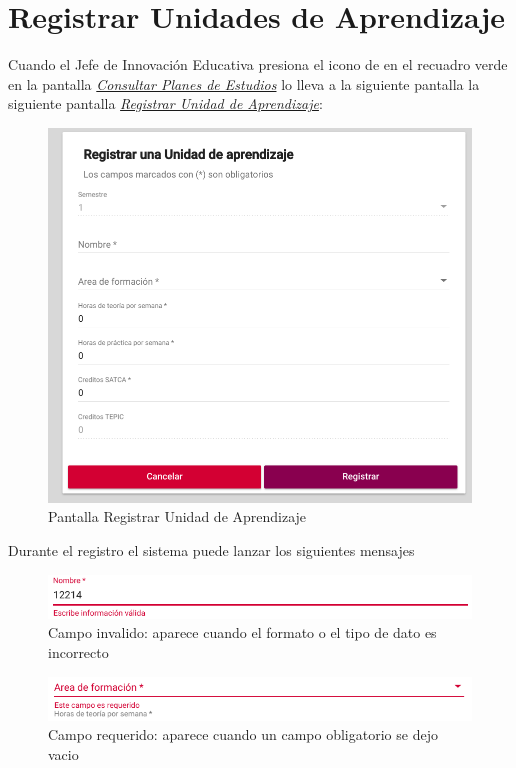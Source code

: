 \section{Registrar Unidades de Aprendizaje}
Cuando el Jefe de Innovación Educativa presiona el icono de \IUbutton{+} en el recuadro verde en la pantalla \hyperlink{consultarUA}{\textit{Consultar Planes de Estudios}} lo lleva a la siguiente pantalla la siguiente pantalla \hyperlink{registrarUA}{\textit{Registrar Unidad de Aprendizaje}}:\\
\begin{figure}[!hbtp]
    \centering
    \hypertarget{registrarUA}{\includegraphics[width=0.7\linewidth]{images/GUA/registrarUA}}
    \caption{Pantalla Registrar Unidad de Aprendizaje}
    \label{registrarUA}
\end{figure}
\newpage
Durante el registro el sistema puede lanzar los siguientes mensajes
\begin{figure}[!hbtp]
    \centering
    \hypertarget{invalidoR}{\includegraphics[width=0.7\linewidth]{images/GUA/invalido}}
    \caption{Campo invalido: aparece cuando el formato o el tipo de dato es incorrecto}
    \label{invalidoR}
\end{figure}
\begin{figure}[!hbtp]
    \centering
    \hypertarget{requeridoR}{\includegraphics[width=0.7\linewidth]{images/GUA/requerido}}
    \caption{Campo requerido: aparece cuando un campo obligatorio se dejo vacio}
    \label{requeridoR}
\end{figure}
